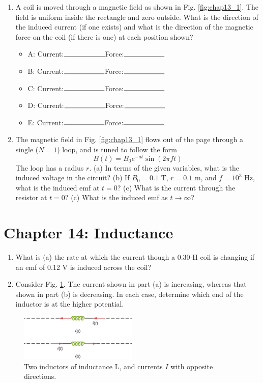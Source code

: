 \documentclass[10pt]{article}
\begin{document}
\begin{enumerate}
\item A coil is moved through a magnetic field as shown in Fig. \ref{fig:chap13_1}. The field is uniform inside the rectangle and zero outside. What is the direction of the induced current (if one exists) and what is the direction of the magnetic force on the coil (if there is one) at each position shown?
\begin{itemize}
\item A: Current:$\rule{2cm}{0.15mm}$Force:$\rule{2cm}{0.15mm}$
\item B: Current:$\rule{2cm}{0.15mm}$Force:$\rule{2cm}{0.15mm}$
\item C: Current:$\rule{2cm}{0.15mm}$Force:$\rule{2cm}{0.15mm}$
\item D: Current:$\rule{2cm}{0.15mm}$Force:$\rule{2cm}{0.15mm}$
\item E: Current:$\rule{2cm}{0.15mm}$Force:$\rule{2cm}{0.15mm}$
\end{itemize}
\item The magnetic field in Fig. \ref{fig:chap13_1} flows out of the page through a single ($N=1$) loop, and is tuned to follow the form
\begin{equation}
B(t) = B_0 e^{-at}\sin(2\pi f t)
\end{equation}
The loop has a radius $r$.  (a) In terms of the given variables, what is the induced voltage in the circuit? (b) If $B_0 = 0.1$ T, $r = 0.1$ m, and $f = 10^3$ Hz, what is the induced emf at $t=0$?  (c) What is the current through the resistor at $t=0$? (c) What is the induced emf as $t \to \infty$? \\ \vspace{3cm}
\end{enumerate}

\section{Chapter 14: Inductance}

\begin{enumerate}
\item What is (a) the rate at which the current though a 0.30-H coil is changing if an emf of 0.12 V is induced across the coil?\\ \vspace{1cm}
\item Consider Fig. \ref{fig:chap14_1}. The current shown in part (a) is increasing, whereas that shown in part (b) is decreasing. In each case, determine which end of the inductor is at the higher potential. \\ \vspace{2cm}
\end{enumerate}

\begin{figure}[hb]
\centering
\includegraphics[width=0.5\textwidth]{induct1.jpeg}
\caption{\label{fig:chap14_1} Two inductors of inductance L, and currents $I$ with opposite directions.}
\end{figure}
\end{document}
